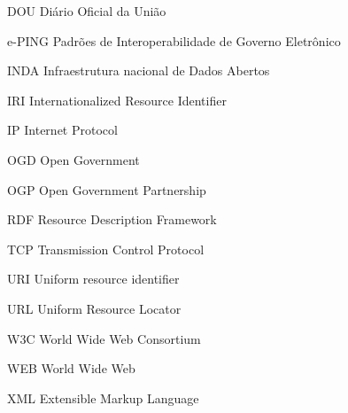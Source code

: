 \begin{siglas}
 
   \item[DOU] Diário Oficial da União 
   \item[e-PING] Padrões de Interoperabilidade de Governo Eletrônico
   \item[INDA] Infraestrutura nacional de Dados Abertos
   \item[IRI]  Internationalized Resource Identifier
   \item[IP] Internet Protocol
   \item[OGD] Open Government
   \item[OGP] Open Government Partnership
   \item[RDF] Resource Description Framework
   \item[TCP] Transmission Control Protocol
   \item[URI] Uniform resource identifier
   \item[URL]  Uniform Resource Locator
   \item[W3C] World Wide Web Consortium
   \item[WEB] World Wide Web
   \item[XML]  Extensible Markup Language
\end{siglas}
